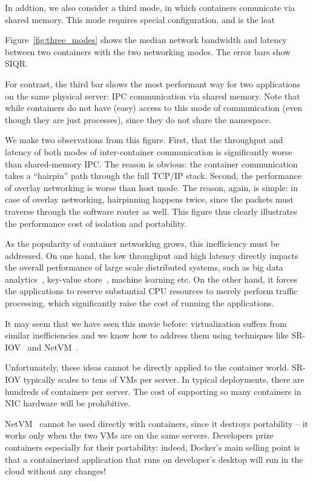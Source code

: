 In addtion, we also consider a third mode, in which containers comunicate via
shared memory. This mode requires special configuration, and is the leat

Figure~\ref{fig:three_modes} shows the median network bandwidth and latency
between two containers with the two networking modes. The error bars show SIQR.

For contrast, the third bar shows the most performant way for two applications
on the same physical server: IPC communication via shared memory.  Note that
while containers do not have (easy) access to this mode of communication (even
though they are just processes), since they do not share the namespace.

We make two observations from this figure. First, that the throughput and
latency of both modes of inter-container communication is significantly worse
than shared-memory IPC. The reason is obvious: the container communication takes
a ``hairpin'' path through the full TCP/IP stack. Second,
the performance of overlay networking is worse than host mode. The reason, again,
is simple: in case of overlay networking, hairpinning happens twice, since the
packets must traverse through the software router as well. This figure thus
clearly illustrates the performance cost of isolation and portability.

As the popularity of container networking grows, this inefficiency must be
addressed. On one hand, the low throughput and high latency directly impacts
the overall performance of large scale distributed systems, such as big data
analytics~\cite{choudhury-paper}, key-value store~\cite{farm}, machine learning
etc.  On the other hand, it forces the applications to reserve substantial CPU
resources to merely perform traffic processing, which significantly raise the
cost of running the applications.

It may seem that we have seen this movie before: virtualization suffers from
similar inefficiencies and we know how to address them using techniques like
SR-IOV~\cite{sriov} and NetVM~\cite{netvm}.

Unfortunately, these ideas cannot be directly applied to the container world.
SR-IOV typically scales to tens of VMs per server. In typical deployments, there
are hundreds of containers per server. The cost of supporting so many containers
in NIC hardware will be prohibitive. 

NetVM~\cite{netvm} cannot be used directly with containers, since it destroys
portability -- it works only when the two VMs are on the same servers.
Developers prize containers especially for their portability: indeed, Docker's
main selling point is that a containerized application that runs on developer's
desktop will run in the cloud without any changes! 

